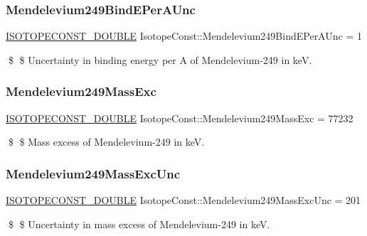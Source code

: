 \subsubsection{\texorpdfstring{Mendelevium249\+Bind\+E\+Per\+A\+Unc}{Mendelevium249BindEPerAUnc}}
{\footnotesize\ttfamily \mbox{\hyperlink{group___isotope_const-_macros_ga8f45a7272ce02c0b4c65c44636ed719a}{I\+S\+O\+T\+O\+P\+E\+C\+O\+N\+S\+T\+\_\+\+D\+O\+U\+B\+LE}} Isotope\+Const\+::\+Mendelevium249\+Bind\+E\+Per\+A\+Unc = 1}

\$ \$ Uncertainty in binding energy per A of Mendelevium-\/249 in keV. \mbox{\label{group___isotope_const-_mendelevium-_md249_gaa62543316dce8806f9bb701f2d6d91e2}} 
\subsubsection{\texorpdfstring{Mendelevium249\+Mass\+Exc}{Mendelevium249MassExc}}
{\footnotesize\ttfamily \mbox{\hyperlink{group___isotope_const-_macros_ga8f45a7272ce02c0b4c65c44636ed719a}{I\+S\+O\+T\+O\+P\+E\+C\+O\+N\+S\+T\+\_\+\+D\+O\+U\+B\+LE}} Isotope\+Const\+::\+Mendelevium249\+Mass\+Exc = 77232}

\$ \$ Mass excess of Mendelevium-\/249 in keV. \mbox{\label{group___isotope_const-_mendelevium-_md249_ga16300fb1751b85315581f9485a614528}} 
\subsubsection{\texorpdfstring{Mendelevium249\+Mass\+Exc\+Unc}{Mendelevium249MassExcUnc}}
{\footnotesize\ttfamily \mbox{\hyperlink{group___isotope_const-_macros_ga8f45a7272ce02c0b4c65c44636ed719a}{I\+S\+O\+T\+O\+P\+E\+C\+O\+N\+S\+T\+\_\+\+D\+O\+U\+B\+LE}} Isotope\+Const\+::\+Mendelevium249\+Mass\+Exc\+Unc = 201}

\$ \$ Uncertainty in mass excess of Mendelevium-\/249 in keV. \mbox{\label{group___isotope_const-_mendelevium-_md249_ga161f10a97b58a57b13f53fb43c796290}} 
